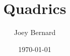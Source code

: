 \documentclass{beamer}
\title{Quadrics}
\author{Joey Bernard}
\institute{University of New Brunswick}
\date{\today}
\begin{document}
\begin{frame}
  \titlepage
\end{frame}

\begin{frame}
  
\end{frame}
\end{document}
